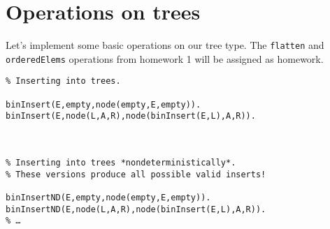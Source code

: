 \documentclass[11pt]{article}
\begin{document}
\section{Operations on trees}
\label{sec:orgee84033}
Let's implement some basic operations on our tree type.
The \texttt{flatten} and \texttt{orderedElems} operations
from homework 1 will be assigned as homework.
\begin{verbatim}
% Inserting into trees.

binInsert(E,empty,node(empty,E,empty)).
binInsert(E,node(L,A,R),node(binInsert(E,L),A,R)).



% Inserting into trees *nondeterministically*.
% These versions produce all possible valid inserts!

binInsertND(E,empty,node(empty,E,empty)).
binInsertND(E,node(L,A,R),node(binInsert(E,L),A,R)).
% …


\end{verbatim}
\end{document}
